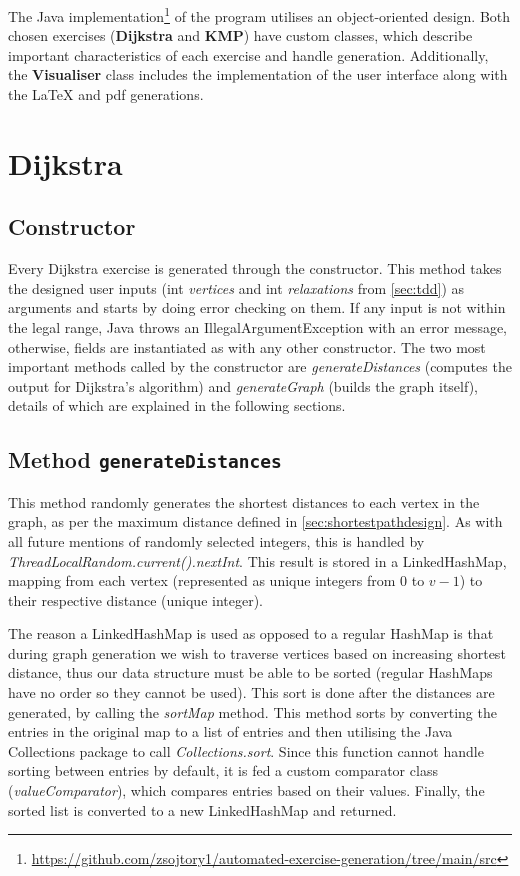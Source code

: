 \documentclass{l4proj}
\begin{document}
The Java implementation\footnote{\url{https://github.com/zsojtory1/automated-exercise-generation/tree/main/src}} of the program utilises an object-oriented design. Both chosen exercises (\textbf{Dijkstra} and \textbf{KMP}) have custom classes, which describe important characteristics of each exercise and handle generation. Additionally, the \textbf{Visualiser} class includes the implementation of the user interface along with the LaTeX and pdf generations.

\section{Dijkstra}

\subsection{Constructor}

Every Dijkstra exercise is generated through the constructor. This method takes the designed user inputs (int \emph{vertices} and int \emph{relaxations} from \autoref{sec:tdd}) as arguments and starts by doing error checking on them. If any input is not within the legal range, Java throws an IllegalArgumentException with an error message, otherwise, fields are instantiated as with any other constructor. The two most important methods called by the constructor are \emph{generateDistances} (computes the output for Dijkstra's algorithm) and \emph{generateGraph} (builds the graph itself), details of which are explained in the following sections.

\subsection{Method \texttt{generateDistances}}

This method randomly generates the shortest distances to each vertex in the graph, as per the maximum distance defined in \autoref{sec:shortestpathdesign}. As with all future mentions of randomly selected integers, this is handled by \emph{ThreadLocalRandom.current().nextInt}. This result is stored in a LinkedHashMap, mapping from each vertex (represented as unique integers from $0$ to $v-1$) to their respective distance (unique integer). 

The reason a LinkedHashMap is used as opposed to a regular HashMap is that during graph generation we wish to traverse vertices based on increasing shortest distance, thus our data structure must be able to be sorted (regular HashMaps have no order so they cannot be used). This sort is done after the distances are generated, by calling the \emph{sortMap} method. This method sorts by converting the entries in the original map to a list of entries and then utilising the Java Collections package to call \emph{Collections.sort}. Since this function cannot handle sorting between entries by default, it is fed a custom comparator class (\emph{valueComparator}), which compares entries based on their values. Finally, the sorted list is converted to a new LinkedHashMap and returned.
\end{document}
